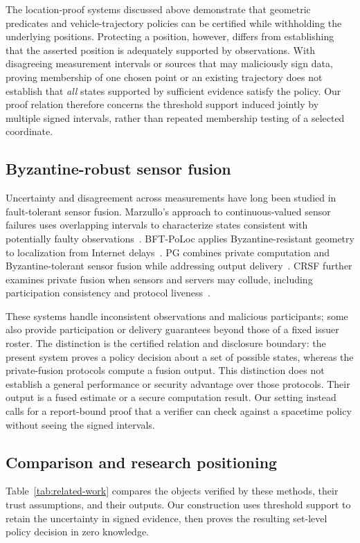 \documentclass[pdflatex,iicol,sn-mathphys-num]{sn-jnl}
\theoremstyle{thmstyleone}
\begin{document}
The location-proof systems discussed above demonstrate that geometric predicates and vehicle-trajectory policies can be certified while withholding the underlying positions. Protecting a position, however, differs from establishing that the asserted position is adequately supported by observations. With disagreeing measurement intervals or sources that may maliciously sign data, proving membership of one chosen point or an existing trajectory does not establish that \emph{all} states supported by sufficient evidence satisfy the policy. Our proof relation therefore concerns the threshold support induced jointly by multiple signed intervals, rather than repeated membership testing of a selected coordinate.

\subsection{Byzantine-robust sensor fusion}
Uncertainty and disagreement across measurements have long been studied in fault-tolerant sensor fusion. Marzullo's approach to continuous-valued sensor failures uses overlapping intervals to characterize states consistent with potentially faulty observations~\citep{Marzullo1990}. BFT-PoLoc applies Byzantine-resistant geometry to localization from Internet delays~\citep{BFTPoLoc}. PG combines private computation and Byzantine-tolerant sensor fusion while addressing output delivery~\citep{PG}. CRSF further examines private fusion when sensors and servers may collude, including participation consistency and protocol liveness~\citep{CRSF}.

These systems handle inconsistent observations and malicious participants; some also provide participation or delivery guarantees beyond those of a fixed issuer roster. The distinction is the certified relation and disclosure boundary: the present system proves a policy decision about a set of possible states, whereas the private-fusion protocols compute a fusion output. This distinction does not establish a general performance or security advantage over those protocols. Their output is a fused estimate or a secure computation result. Our setting instead calls for a report-bound proof that a verifier can check against a spacetime policy without seeing the signed intervals.

\subsection{Comparison and research positioning}
Table~\ref{tab:related-work} compares the objects verified by these methods, their trust assumptions, and their outputs. Our construction uses threshold support to retain the uncertainty in signed evidence, then proves the resulting set-level policy decision in zero knowledge.
\end{document}
